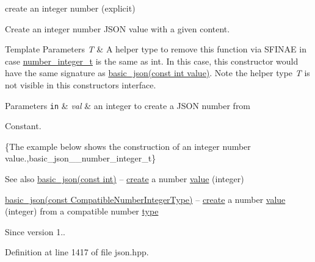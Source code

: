 create an integer number (explicit) 

Create an integer number J\+S\+O\+N value with a given content.


\begin{DoxyTemplParams}{Template Parameters}
{\em T} & A helper type to remove this function via S\+F\+I\+N\+A\+E in case \hyperlink{classnlohmann_1_1basic__json_ac4b10b2364f26ce47bdb9a413ff04a59}{number\+\_\+integer\+\_\+t} is the same as {\ttfamily int}. In this case, this constructor would have the same signature as \hyperlink{classnlohmann_1_1basic__json_a70ae1f0747f5b7a89979512866474f1a}{basic\+\_\+json(const int value)}. Note the helper type {\itshape T} is not visible in this constructor\textquotesingle{}s interface.\\
\hline
\end{DoxyTemplParams}

\begin{DoxyParams}[1]{Parameters}
\mbox{\tt in}  & {\em val} & an integer to create a J\+S\+O\+N number from\\
\hline
\end{DoxyParams}
Constant.

\{The example below shows the construction of an integer number value.,basic\+\_\+json\+\_\+\+\_\+number\+\_\+integer\+\_\+t\}

\begin{DoxySeeAlso}{See also}
\hyperlink{classnlohmann_1_1basic__json_a70ae1f0747f5b7a89979512866474f1a}{basic\+\_\+json(const int)} -- \hyperlink{classnlohmann_1_1basic__json_a27df4303fbc83071275074486b54a40e}{create} a number \hyperlink{classnlohmann_1_1basic__json_a0a2cbbd95862a623e7dc5c37e67dead0}{value} (integer) 

\hyperlink{classnlohmann_1_1basic__json_ad2eddc2c13ab084f067eaba65d381ad2}{basic\+\_\+json(const Compatible\+Number\+Integer\+Type)} -- \hyperlink{classnlohmann_1_1basic__json_a27df4303fbc83071275074486b54a40e}{create} a number \hyperlink{classnlohmann_1_1basic__json_a0a2cbbd95862a623e7dc5c37e67dead0}{value} (integer) from a compatible number \hyperlink{classnlohmann_1_1basic__json_a848cbae3bd3502ffbf738320bf5eb3aa}{type}
\end{DoxySeeAlso}
\begin{DoxySince}{Since}
version 1.. 
\end{DoxySince}


Definition at line 1417 of file json.\+hpp.

\hypertarget{classnlohmann_1_1basic__json_a70ae1f0747f5b7a89979512866474f1a}{}
